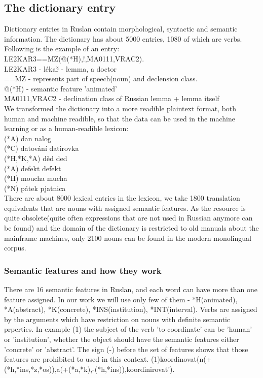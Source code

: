 \documentclass[letterpaper]{article}
\begin{document}
\begin{itemize}
\subsection{The dictionary entry}
Dictionary entries in Ruslan contain morphological,
syntactic and semantic information.
The dictionary has about 5000 entries, 1080 of which are verbs.
Following is the example of an entry:\\
LE2KAR3==MZ(@(*H),!,MA0111,VRAC2).\\
LE2KAR3 - lékař - lemma, a doctor\\
==MZ - represents part of speech(noun) and declension class.\\
@(*H) - semantic feature 'animated'\\
MA0111,VRAC2 - declination class of Russian lemma + lemma itself\\
We transformed the dictionary into a more readible plaintext format,
both human and machine readible, so that the data can be used in
the machine learning or as a human-readible lexicon:\\
(*A) dan nalog\\
(*C) datování datirovka\\
(*H,*K,*A) děd ded\\
(*A) defekt defekt\\
(*H) moucha mucha\\
(*N) pátek pjatnica\\
There are about 8000 lexical entries in the lexicon, we take 1800
translation equivalents that are nouns with assigned semantic features.
As the resource is quite obsolete(quite often expressions that are not used in Russian
anymore can be found) and the domain of the dictionary is restricted to old manuals
about the mainframe machines, only 2100 nouns
can be found in the modern monolingual corpus.
\subsubsection{Semantic features and how they work}
There are 16 semantic features in Ruslan, and each word can have more than one
feature assigned. In our work we will use only few of them - *H(animated), *A(abstract),
*K(concrete), *INS(institution), *INT(interval). Verbs are assigned by the arguments
which have restriction on nouns with definite semantic prperties. In example (1)
the subject of the verb 'to coordinate' can be 'human' or 'institution', whether
the object should have the semantic features either 'concrete' or 'abstract'. The sign (-)
before the set of features shows that those features are prohibited to used in this context.
(1)koordinovat(n(+(*h,*ins,*z,*os)),a(+(*a,*k),-(*h,*ins)),koordinirovat').


\end{itemize}
\end{document}

